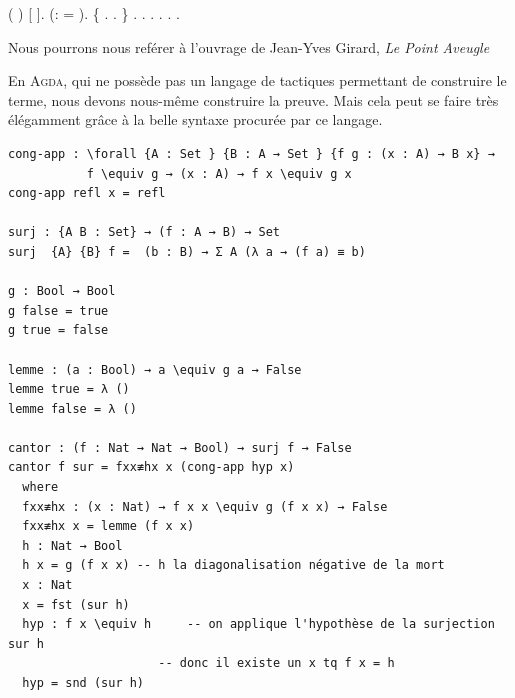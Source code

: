  \begin{coqdoccode}
\coqdocindent{2.00em}
 ( )  [ ].\coqdoceol
\coqdocindent{2.00em}
 (:   =   ).\coqdoceol
\coqdocindent{2.00em}
\{\coqdoceol
\coqdocindent{4.00em}
 . .\coqdoceol
\coqdocindent{2.00em}
\}\coqdoceol
\coqdocindent{2.00em}
   .\coqdoceol
\coqdocindent{2.00em}
   .\coqdoceol
\coqdocindent{2.00em}
   .\coqdoceol
\coqdocindent{2.00em}
.\coqdoceol
\coqdocnoindent
{}.\coqdoceol
\coqdocemptyline
\coqdocnoindent
{} .\coqdoceol
\end{coqdoccode}

Nous pourrons nous reférer à l'ouvrage de Jean-Yves Girard, \textit{Le Point Aveugle}
\cite{girard}


En \textsc{Agda}, qui ne possède pas un langage de tactiques permettant de construire le terme, 
nous devons nous-même construire la preuve. Mais cela peut se faire très élégamment
grâce à la belle syntaxe procurée par ce langage.\cite[Program = Proof]{PP}

\begin{verbatim}
cong-app : \forall {A : Set } {B : A → Set } {f g : (x : A) → B x} →
           f \equiv g → (x : A) → f x \equiv g x
cong-app refl x = refl

surj : {A B : Set} → (f : A → B) → Set
surj  {A} {B} f =  (b : B) → Σ A (λ a → (f a) ≡ b)

g : Bool → Bool
g false = true
g true = false

lemme : (a : Bool) → a \equiv g a → False
lemme true = λ ()  
lemme false = λ ()  

cantor : (f : Nat → Nat → Bool) → surj f → False
cantor f sur = fxx≢hx x (cong-app hyp x) 
  where 
  fxx≢hx : (x : Nat) → f x x \equiv g (f x x) → False
  fxx≢hx x = lemme (f x x)
  h : Nat → Bool
  h x = g (f x x) -- h la diagonalisation négative de la mort
  x : Nat
  x = fst (sur h)
  hyp : f x \equiv h     -- on applique l'hypothèse de la surjection sur h
                     -- donc il existe un x tq f x = h
  hyp = snd (sur h)
\end{verbatim}

